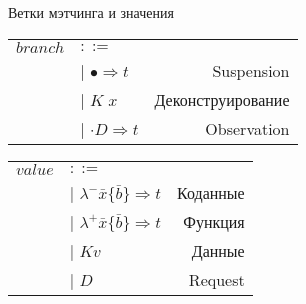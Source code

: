 \documentclass[10pt, mathserif]{beamer}
\let\\\tabularnewline
\let\\\tabularnewline
\theoremstyle{definition}
\begin{document}
\begin{frame}[c]{Ветки мэтчинга и значения}
\begin{tabular}{ l l r }
  $branch$ & $::=$ & \\
  &|  $\bullet \Rightarrow t$ & Suspension \\
  &|  $K\;x$ & Деконструирование \\
  &|  $\cdot D \Rightarrow t$  & Observation  \\
\end{tabular}

\vspace{1cm}

\begin{tabular}{ l l r }
  $value$ & $::=$ & \\
  &|  $\lambda^{-} \bar{x}\{\bar{b}\} \Rightarrow t$ & Коданные\\
  &|  $\lambda^{+} \bar{x}\{\bar{b}\} \Rightarrow t$ & Функция \\
  &|  $K v$ & Данные\\
  &|  $D$   & Request\\
\end{tabular}
\end{frame}
\end{document}

